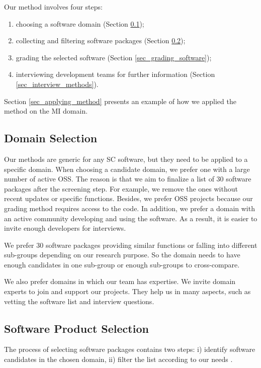 \documentclass[3p, 12pt,authoryear]{elsarticle}
\begin{document}
Our method involves four steps:
\begin{enumerate}
\item choosing a software domain (Section \ref{sec_domain_selection});
\item collecting and filtering software packages (Section
\ref{sec_software_selection});
\item grading the selected software (Section \ref{sec_grading_software});
\item interviewing development teams for further information (Section
\ref{sec_interview_methods}).
\end{enumerate}

\noindent Section \ref{sec_applying_method} presents an example of how we
applied the method on the MI domain.

\subsection{Domain Selection} \label{sec_domain_selection}

Our methods are generic for any SC software, but they need to be applied to a
specific domain. When choosing a candidate domain, we prefer one with a large
number of active OSS. The reason is that we aim to finalize a list of 30
software packages \citep{SmithEtAl2021} after the screening step. For example, we
remove the ones without recent updates or specific functions. Besides, we prefer
OSS projects because our grading method requires access to the code. In
addition, we prefer a domain with an active community developing and using the
software. As a result, it is easier to invite enough developers for interviews.

We prefer 30 software packages providing similar functions or falling into
different sub-groups depending on our research purpose. So the domain needs to
have enough candidates in one sub-group or enough sub-groups to cross-compare.

We also prefer domains in which our team has expertise. We invite domain experts
to join and support our projects. They help us in many aspects, such as vetting
the software list and interview questions.

\subsection{Software Product Selection} \label{sec_software_selection}

The process of selecting software packages contains two steps: i) identify
software candidates in the chosen domain, ii) filter the list according to our
needs \citep{SmithEtAl2021}.
\end{document}
